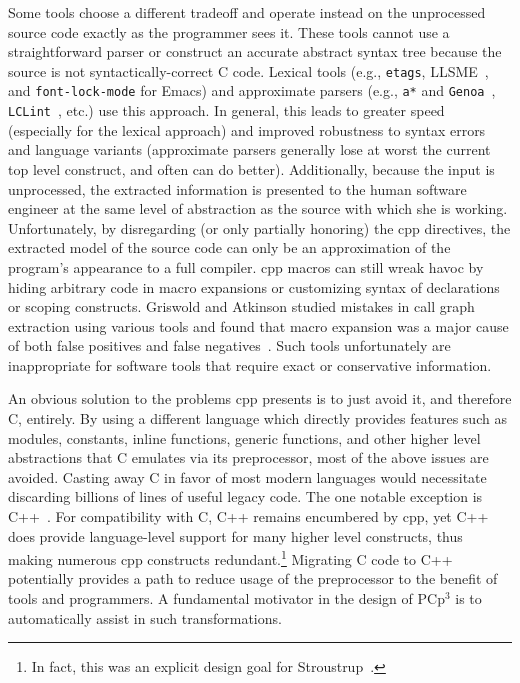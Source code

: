 \documentclass{article}
\newcommand{\pcp}{\mbox{\textsf{PCp}$^3$}}
\newcommand{\Cpp}{\mbox{\textsf{cpp}}}
\newcommand{\CPP}{\mbox{\textsf{C++}}}
\newcommand{\C}{\mbox{\textsf{C}}}
\newcommand{\eg}{e.g.,}
\newcommand{\etc}{etc}  %
\begin{document}
Some tools choose a different tradeoff and operate instead on the
unprocessed source code exactly as the programmer sees it.  These tools
cannot use a straightforward parser or construct an accurate abstract
syntax tree because the source is not syntactically-correct \C{} code.
Lexical tools (\eg{} \texttt{etags}, LLSME~\cite{Murphy95}, and
\texttt{font-lock-mode} for Emacs) and approximate parsers
(\eg{} \texttt{a*} and \texttt{Genoa}~\cite{Devanbu92},
\texttt{LCLint}~\cite{LCLint}, \etc.) use this approach.  In general,
this leads to greater speed (especially for the lexical approach) and
improved robustness to syntax errors and language variants (approximate
parsers generally lose at worst the current top level construct, and
often can do better). Additionally, because the input is unprocessed,
the extracted information is presented to the human software engineer at
the same level of abstraction as the source with which she is working.
Unfortunately, by disregarding (or only partially honoring) the \Cpp{}
directives, the extracted model of the source code can only be an
approximation of the program's appearance to a full compiler.  \Cpp{}
macros can still wreak havoc by hiding arbitrary code in macro
expansions or customizing syntax of declarations or scoping constructs.
Griswold and Atkinson studied mistakes in call graph extraction using
various tools and found that macro expansion was a major cause of both
false positives and false negatives~\cite{Griswold96}.  Such tools
unfortunately are inappropriate for software tools that require exact or
conservative information.

An obvious solution to the problems \Cpp{} presents is to just avoid it,
and therefore \C{}, entirely.  By using a different language which
directly provides features such as modules, constants, inline functions,
generic functions, and other higher level abstractions that \C{}
emulates via its preprocessor, most of the above issues are avoided.
Casting away \C{} in favor of most modern languages would necessitate
discarding billions of lines of useful legacy code.  The one notable
exception is \CPP{}~\cite{CD2DraftStandard}. For compatibility with
\C{}, \CPP{} remains encumbered by \Cpp{}, yet \CPP{} does provide
language-level support for many higher level constructs, thus making
numerous \Cpp{} constructs redundant.\footnote{In fact, this was an
  explicit design goal for Stroustrup~\cite[p.~424]{Stroustrup94}.}
Migrating \C{} code to \CPP{} potentially provides a path to reduce
usage of the preprocessor to the benefit of tools and programmers.  A
fundamental motivator in the design of \pcp{} is to automatically assist
in such transformations.
\end{document}
